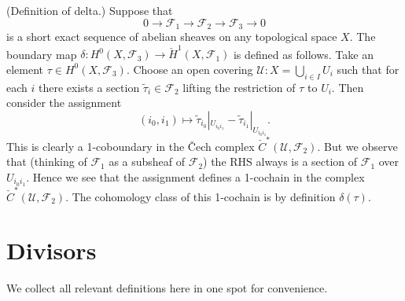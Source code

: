 \begin{definition}
\label{definition-delta}
(Definition of delta.) Suppose that
$$
0 \to {\mathcal F}_1 \to {\mathcal F}_2 \to {\mathcal F}_3 \to 0
$$
is a short exact sequence of abelian sheaves on any topological space $X$.
The boundary map
$\delta : H^0(X, {\mathcal F}_3) \to {\check H}^1(X, {\mathcal F}_1)$
is defined as follows. Take an element $\tau \in H^0(X, {\mathcal F}_3)$.
Choose an open covering ${\mathcal U} : X = \bigcup_{i\in I} U_i$ such
that for each $i$ there exists a section $\tilde \tau_i \in {\mathcal F}_2$
lifting the restriction of $\tau$ to $U_i$. Then consider the assignment
$$
(i_0, i_1) \longmapsto
\tilde \tau_{i_0}|_{U_{i_0i_1}} - \tilde \tau_{i_1}|_{U_{i_0i_1}}.
$$
This is clearly a 1-coboundary in the {\v C}ech complex
${\check C}^\ast({\mathcal U}, {\mathcal F}_2)$. But we observe that
(thinking of ${\mathcal F}_1$ as a subsheaf of ${\mathcal F}_2$) the RHS
always is a section of ${\mathcal F}_1$ over $U_{i_0i_1}$. Hence we
see that the assignment defines a 1-cochain in the complex
${\check C}^\ast({\mathcal U}, {\mathcal F}_2)$. The cohomology
class of this 1-cochain is by definition {\it $\delta(\tau)$}.
\end{definition}



\section{Divisors}
\label{section-divisors}

\noindent
We collect all relevant definitions here in one spot for convenience.

